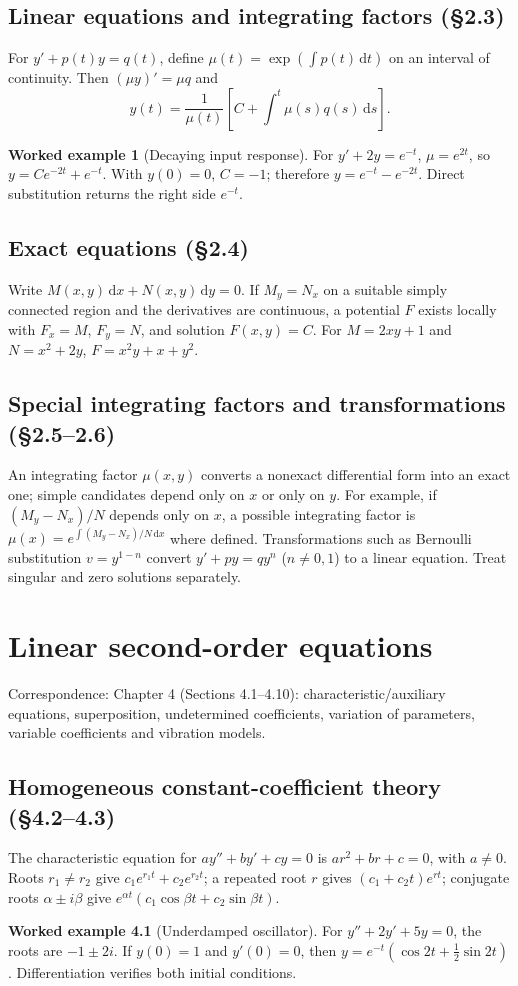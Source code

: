 \documentclass[11pt,letterpaper,oneside]{report}
\theoremstyle{definition}\newtheorem{definition}[theorem]{Definition}
\newtheorem{example}[theorem]{Worked example}
\theoremstyle{remark}\newtheorem{remark}[theorem]{Remark}
\newcommand{\dd}{\,\mathrm{d}}
\begin{document}
\section{Linear equations and integrating factors (\S2.3)}
For $y'+p(t)y=q(t)$, define $\mu(t)=\exp(\int p(t)\dd t)$ on an interval of continuity. Then $(\mu y)'=\mu q$ and
\[y(t)=\frac{1}{\mu(t)}\left[C+\int^t\mu(s)q(s)\dd s\right].\]
\begin{example}[Decaying input response]
For $y'+2y=e^{-t}$, $\mu=e^{2t}$, so $y=Ce^{-2t}+e^{-t}$. With $y(0)=0$, $C=-1$; therefore $y=e^{-t}-e^{-2t}$. Direct substitution returns the right side $e^{-t}$.
\end{example}
\section{Exact equations (\S2.4)}
Write $M(x,y)\dd x+N(x,y)\dd y=0$. If $M_y=N_x$ on a suitable simply connected region and the derivatives are continuous, a potential $F$ exists locally with $F_x=M$, $F_y=N$, and solution $F(x,y)=C$. For $M=2xy+1$ and $N=x^2+2y$, $F=x^2y+x+y^2$.
\section{Special integrating factors and transformations (\S2.5--2.6)}
An integrating factor $\mu(x,y)$ converts a nonexact differential form into an exact one; simple candidates depend only on $x$ or only on $y$. For example, if $(M_y-N_x)/N$ depends only on $x$, a possible integrating factor is $\mu(x)=e^{\int (M_y-N_x)/N\dd x}$ where defined. Transformations such as Bernoulli substitution $v=y^{1-n}$ convert $y'+p y=q y^n$ ($n\ne0,1$) to a linear equation. Treat singular and zero solutions separately.
\chapter{Linear second-order equations}
\begin{bookground}Correspondence: Chapter 4 (Sections 4.1--4.10): characteristic/auxiliary equations, superposition, undetermined coefficients, variation of parameters, variable coefficients and vibration models.\end{bookground}
\section{Homogeneous constant-coefficient theory (\S4.2--4.3)}
The characteristic equation for $a y''+b y'+c y=0$ is $ar^2+br+c=0$, with $a\ne0$. Roots $r_1\ne r_2$ give $c_1e^{r_1t}+c_2e^{r_2t}$; a repeated root $r$ gives $(c_1+c_2t)e^{rt}$; conjugate roots $\alpha\pm i\beta$ give $e^{\alpha t}(c_1\cos\beta t+c_2\sin\beta t)$.
\begin{example}[Underdamped oscillator]
For $y''+2y'+5y=0$, the roots are $-1\pm2i$. If $y(0)=1$ and $y'(0)=0$, then $y=e^{-t}(\cos2t+\tfrac12\sin2t)$. Differentiation verifies both initial conditions.
\end{example}
\end{document}
